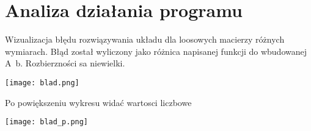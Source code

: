\documentclass[11pt]{article}
\begin{document}
\section*{Analiza działania programu}
Wizualizacja błędu rozwiązywania układu dla loosowych macierzy różnych wymiarach. Błąd został wyliczony jako różnica napisanej funkcji do wbudowanej A\ b. Rozbierzności sa niewielki.
\begin{center}
\texttt{[image: blad.png]}
\end{center}
Po powiększeniu wykresu widać wartosci liczbowe
\begin{center}
\texttt{[image: blad\_p.png]}
\end{center}
\end{document}
